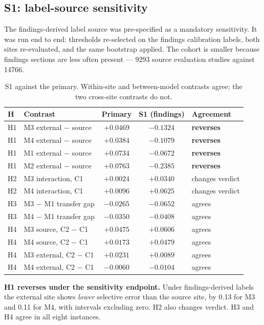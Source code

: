 \subsection{S1: label-source sensitivity}
\label{sec:s1}

The findings-derived label source was pre-specified as a mandatory sensitivity.
It was run end to end: thresholds re-selected on the findings calibration
labels, both sites re-evaluated, and the same bootstrap applied. The cohort is
smaller because findings sections are less often present --- \num{9293} source
evaluation studies against \num{14766}.

\begin{table}[htbp]
\centering
\caption{S1 against the primary. Within-site and between-model contrasts agree;
the two cross-site contrasts do not.}
\label{tab:s1}
\begin{tabular}{llccl}
\toprule
H & Contrast & Primary & S1 (findings) & Agreement \\
\midrule
H1 & M3 external $-$ source & $+0.0469$ & $-0.1324$ & \textbf{reverses} \\
H1 & M4 external $-$ source & $+0.0384$ & $-0.1079$ & \textbf{reverses} \\
H1 & M1 external $-$ source & $+0.0734$ & $-0.0672$ & \textbf{reverses} \\
H1 & M2 external $-$ source & $+0.0763$ & $-0.2385$ & \textbf{reverses} \\
H2 & M3 interaction, C1     & $+0.0024$ & $+0.0340$ & changes verdict \\
H2 & M4 interaction, C1     & $+0.0096$ & $+0.0625$ & changes verdict \\
H3 & M3 $-$ M1 transfer gap & $-0.0265$ & $-0.0652$ & agrees \\
H3 & M4 $-$ M1 transfer gap & $-0.0350$ & $-0.0408$ & agrees \\
H4 & M3 source, C2 $-$ C1   & $+0.0475$ & $+0.0606$ & agrees \\
H4 & M4 source, C2 $-$ C1   & $+0.0173$ & $+0.0479$ & agrees \\
H4 & M3 external, C2 $-$ C1 & $+0.0231$ & $+0.0089$ & agrees \\
H4 & M4 external, C2 $-$ C1 & $-0.0060$ & $-0.0104$ & agrees \\
\bottomrule
\end{tabular}
\end{table}

\textbf{H1 reverses under the sensitivity endpoint.} Under findings-derived
labels the external site shows \emph{lower} selective error than the source
site, by \num{0.13} for M3 and \num{0.11} for M4, with intervals excluding zero.
H2 also changes verdict. H3 and H4 agree in all eight instances.

